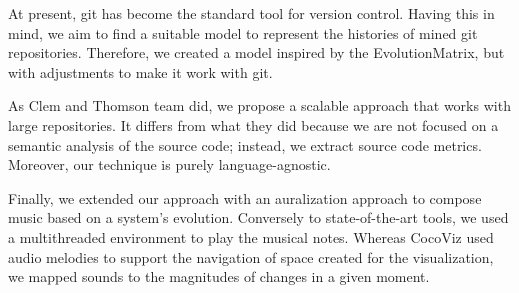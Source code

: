 At present, git has become the standard tool for version control. 
Having this in mind, we aim to find a suitable model to represent the histories of mined git repositories.
Therefore, we created a model inspired by the EvolutionMatrix, but with adjustments to make it work with git.

As Clem and Thomson \cite{Clem2021} team did, we propose a scalable approach that works with large repositories. 
It differs from what they did because we are not focused on a semantic analysis of the source code; instead, we extract source code metrics. 
Moreover, our technique is purely language-agnostic.

Finally, we extended our approach with an auralization approach to compose music based on a system’s evolution. 
Conversely to state-of-the-art tools, we used a multithreaded environment to play the musical notes. 
Whereas CocoViz used audio melodies to support the navigation of space created for the visualization, we mapped sounds to the magnitudes of changes in a given moment. 





